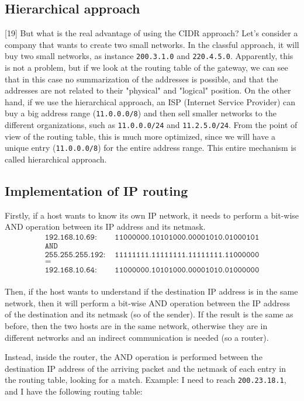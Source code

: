 \subsection{Hierarchical approach} [19]
But what is the real advantage of using the CIDR approach? Let's consider a company that wants to create two small networks. In the classful approach, it will buy two small networks, as instance \texttt{200.3.1.0} and \texttt{220.4.5.0}. Apparently, this is not a problem, but if we look at the routing table of the gateway, we can see that in this case no summarization of the addresses is possible, and that the addresses are not related to their "physical" and "logical" position. On the other hand, if we use the hierarchical approach, an ISP (Internet Service Provider) can buy a big address range (\texttt{11.0.0.0/8}) and then sell smaller networks to the different organizations, such as \texttt{11.0.0.0/24} and \texttt{11.2.5.0/24}. From the point of view of the routing table, this is much more optimized, since we will have a unique entry (\texttt{11.0.0.0/8}) for the entire address range. This entire mechanism is called hierarchical approach.

\subsection{Implementation of IP routing}
Firstly, if a host wants to know its own IP network, it needs to perform a bit-wise AND operation between its IP address and its netmask. 
\begin{align*}
    \texttt{192.168.10.69:}&\texttt{ 11000000.10101000.00001010.01000101}\\
    \texttt{AND}\\
    \texttt{255.255.255.192:}&\texttt{ 11111111.11111111.11111111.11000000}\\
    \texttt{=}\\
    \texttt{192.168.10.64:}&\texttt{ 11000000.10101000.00001010.01000000}\\
\end{align*}

Then, if the host wants to understand if the destination IP address is in the same network, then it will perform a bit-wise AND operation between the IP address of the destination and its netmask (so of the sender). If the result is the same as before, then the two hosts are in the same network, otherwise they are in different networks and an indirect communication is needed (so a router).

Instead, inside the router, the AND operation is performed between the destination IP address of the arriving packet and the netmask of each entry in the routing table, looking for a match. Example: I need to reach \texttt{200.23.18.1}, and I have the following routing table:

